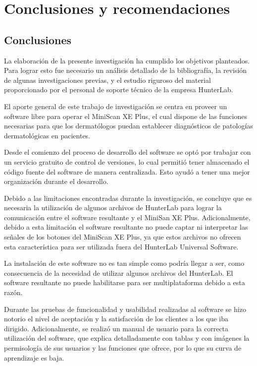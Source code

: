 \chapter{Conclusiones y recomendaciones}

\section{Conclusiones}

	La elaboraci\'{o}n de la presente investigaci\'{o}n ha cumplido los objetivos planteados. Para lograr esto fue necesario un an\'{a}lisis detallado de la bibliograf\'{i}a, la revisi\'{o}n de algunas investigaciones previas, y el estudio riguroso del material proporcionado por el personal de soporte t\'{e}cnico de la empresa HunterLab.
	
	El aporte general de este trabajo de investigaci\'{o}n se centra en proveer un software libre para operar el MiniScan XE Plus, el cual dispone de las funciones necesarias para que los dermat\'{o}logos puedan establecer diagn\'{o}sticos de patolog\'{i}as dermatol\'{o}gicas en pacientes.
	
	Desde el comienzo del proceso de desarrollo del software se opt\'{o} por trabajar con un servicio gratuito de control de versiones, lo cual permiti\'{o} tener almacenado el c\'{o}digo fuente del software de manera centralizada. Esto ayud\'{o} a tener una mejor organizaci\'{o}n durante el desarrollo.
	
	Debido a las limitaciones encontradas durante la investigaci\'{o}n, se concluye que es necesaria la utilizaci\'{o}n de algunos archivos de HunterLab para lograr la comunicaci\'{o}n entre el software resultante y el MiniSan XE Plus. Adicionalmente, debido a esta limitaci\'{o}n el software resultante no puede captar ni interpretar las se\~{n}ales de los botones del MiniScan XE Plus, ya que estos archivos no ofrecen esta caracter\'{i}stica para ser utilizada fuera del HunterLab Universal Software.
	
	La instalaci\'{o}n de este software no es tan simple como podr\'{i}a llegar a ser, como consecuencia de la necesidad de utilizar algunos archivos del HunterLab. El software resultante no puede habilitarse para ser multiplataforma debido a esta raz\'{o}n.

	Durante las pruebas de funcionalidad y usabilidad realizadas al software se hizo notorio el nivel de aceptaci\'{o}n y la satisfacci\'{o}n de los clientes a los que iba dirigido. Adicionalmente, se realiz\'{o} un manual de usuario para la correcta utilizaci\'{o}n del software, que explica detalladamente con tablas y con im\'{a}genes la permisolog\'{i}a de sus usuarios y las funciones que ofrece, por lo que su curva de aprendizaje es baja.

